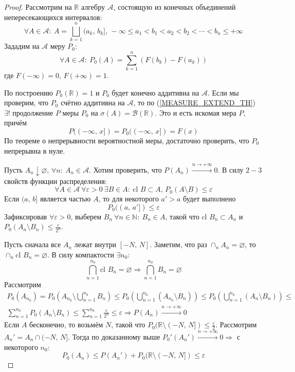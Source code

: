 \documentclass[a4paper,12pt]{article}
\renewcommand{\leq}{\ensuremath{\leqslant}}
\renewcommand{\emptyset}{\ensuremath{\varnothing}}
\newcommand{\cl}{\text{cl }}
\theoremstyle{plain}
\theoremstyle{definition}
\theoremstyle{remark}
\begin{document}
\begin{proof}
	Рассмотрим на $\mathbb{R}$ алгебру $\mathcal{A}$, состоящую из конечных объединений непересекающихся интервалов:
	\[\forall A \in \mathcal{A}:\: A = \bigsqcup_{k = 1}^n (a_k,\,b_k],\, -\infty \leq a_1 < b_1 < a_2 < b_2 < \cdots < b_n \leq +\infty\]
	Зададим на $\mathcal{A}$ меру $P_0$:
	\[\forall A \in \mathcal{A}:\: P_0(A) = \sum_{k = 1}^n (F(b_k) - F(a_k))\]
	где $F(-\infty) = 0,\, F(+\infty) = 1$.

	По построению $P_0(\mathbb{R}) = 1$ и $P_0$ будет конечно аддитивна на $\mathcal{A}$. Если мы проверим, что $P_0$ счётно аддитивна на $\mathcal{A}$, то по (\ref{MEASURE_EXTEND_TH}) $\exists!$ продолжение $P$ меры $P_0$ на $\sigma(A) = \mathcal{B}(\mathbb{R})$. Это и есть искомая мера $P$, причём
	\[P((-\infty,\, x]) = P_0((-\infty,\, x]) = F(x)\]
	По теореме о непрерывности вероятностной меры, достаточно проверить, что $P_0$ непрерывна в нуле.

	Пусть $A_n \downarrow \emptyset,\, \forall n :\: A_n \in \mathcal{A}$. Хотим проверить, что $P(A_n) \stackrel{n \to +\infty}{\to} 0$. В силу $2-3$ свойств функции распределения:
	\[\forall A \in \mathcal{A} \: \forall \varepsilon > 0 \: \exists B \in A :\: \cl B \subset A,\, P_0(A \setminus B) \leq \varepsilon\]
	Если $(a,\,b]$ является частью $A$, то для некоторого $a' > a$ будет выполнено
	\[P_0((a,\, a']) \leq \varepsilon\]
	Зафиксировав $\forall \varepsilon > 0$, выберем $B_n \: \forall n \in \mathbb{N}:\: B_n \in A$, такой что $\cl B_n \subset A_n$ и $P_0(A_n \setminus B_n) \leq \frac{\varepsilon}{2^n}$.

	Пусть сначала все $A_n$ лежат внутри $[-N,\,N]$. Заметим, что раз $\cap_n A_n = \emptyset$, то $\cap_n \cl B_n = \emptyset$. В силу компактости $\exists n_0$:
	\[\bigcap_{n = 1}^{n_0} \cl B_n = \emptyset \Rightarrow \bigcap_{n = 1}^{n_0} B_n = \emptyset\]
	Рассмотрим
	\begin{align*}
		P_0(A_{n_0}) = P_0\left(A_{n_0} \setminus \bigcup_{n = 1}^{n_0}B_n\right) \leq P_0\left(\bigcup_{n = 1}^{n_0}(A_{n_0}\setminus B_n)\right) \leq P_0\left(\bigcup_{n = 1}^{n_0}(A_n \setminus B_n)\right) \leq \\
		\sum_{n = 1}^{n_0}P_0(A_n \setminus B_n) \leq \sum_{n = 1}^{n_0}\frac{\varepsilon}{2^n} \leq \varepsilon \Rightarrow P(A_n) \stackrel{n \to +\infty}{\to} 0
	\end{align*}
	Если $A$ бесконечно, то возьмём $N$, такой что $P_0(\mathbb{R} \setminus (-N,\, N]) \leq \frac{\varepsilon}{2}$. Рассмотрим $A_n' = A_n \cap (-N,\, N]$. Тогда по доказанному выше $P_0'(A_n') \stackrel{n \to +\infty}{\to} 0 \Rightarrow$ с некоторого $n_0$:
	\[P_0(A_n) \leq P(A_n') + P_0(\mathbb{R}\setminus (-N,\, N]) \leq \varepsilon\]
\end{proof}
\end{document}
